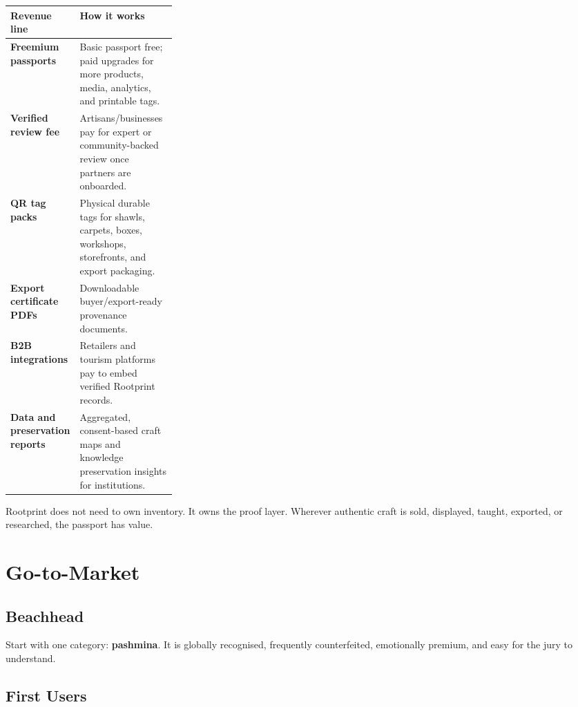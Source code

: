 \documentclass[11pt,a4paper]{article}
\begin{document}
\begin{center}
\begin{tabularx}{\linewidth}{>{\bfseries}p{0.28\linewidth}X}
\toprule
Revenue line & How it works \\
\midrule
Freemium passports & Basic passport free; paid upgrades for more products, media, analytics, and printable tags. \\
Verified review fee & Artisans/businesses pay for expert or community-backed review once partners are onboarded. \\
QR tag packs & Physical durable tags for shawls, carpets, boxes, workshops, storefronts, and export packaging. \\
Export certificate PDFs & Downloadable buyer/export-ready provenance documents. \\
B2B integrations & Retailers and tourism platforms pay to embed verified Rootprint records. \\
Data and preservation reports & Aggregated, consent-based craft maps and knowledge preservation insights for institutions. \\
\bottomrule
\end{tabularx}
\end{center}

\begin{goldbox}
Rootprint does not need to own inventory. It owns the proof layer. Wherever authentic craft is sold, displayed, taught, exported, or researched, the passport has value.
\end{goldbox}

\section{Go-to-Market}

\subsection{Beachhead}

Start with one category: \textbf{pashmina}. It is globally recognised, frequently counterfeited, emotionally premium, and easy for the jury to understand.

\subsection{First Users}
\end{document}
